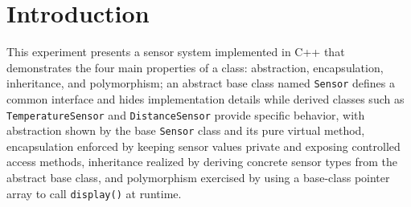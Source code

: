\section{Introduction}
This experiment presents a sensor system implemented in C++ that demonstrates the four main properties of a class: abstraction, encapsulation, inheritance, and polymorphism; an abstract base class named \texttt{Sensor} defines a common interface and hides implementation details while derived classes such as \texttt{TemperatureSensor} and \texttt{DistanceSensor} provide specific behavior, with abstraction shown by the base \texttt{Sensor} class and its pure virtual method, encapsulation enforced by keeping sensor values private and exposing controlled access methods, inheritance realized by deriving concrete sensor types from the abstract base class, and polymorphism exercised by using a base-class pointer array to call \texttt{display()} at runtime.
